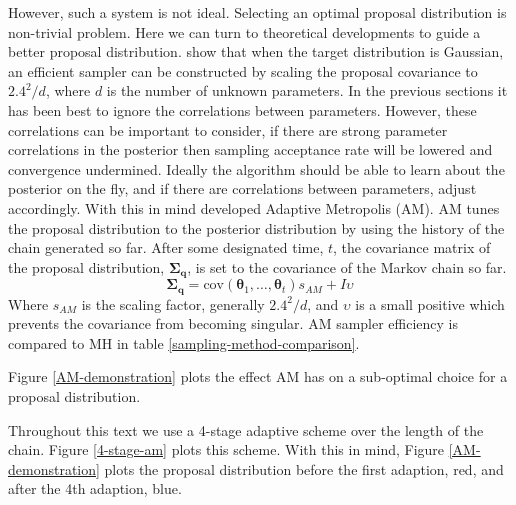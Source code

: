 However, such a system is not ideal. Selecting an optimal proposal distribution is non-trivial problem. Here we can turn to theoretical developments to guide a better proposal distribution. \citet{Gelman1996} show that when the target distribution is Gaussian, an efficient sampler can be constructed by scaling the proposal covariance to $2.4^2/d$, where $d$ is the number of unknown parameters. In the previous sections it has been best to ignore the correlations between parameters. However, these correlations can be important to consider, if there are strong parameter correlations in the posterior then sampling acceptance rate will be lowered and convergence undermined. Ideally the algorithm should be able to learn about the posterior on the fly, and if there are correlations between parameters, adjust accordingly. With this in mind \citet{haario2001} developed Adaptive Metropolis (AM). AM tunes the proposal distribution to the posterior distribution by using the history of the chain generated so far. After some designated time, $t$, the covariance matrix of the proposal distribution, $\bm{\Sigma_q}$, is set to the covariance of the Markov chain so far. 
\begin{equation}
\bm{\Sigma_q} = \text{cov}(\bm{\theta}_1,\dots,\bm{\theta}_t)s_{AM} + I\upsilon
\end{equation}
Where $s_{AM}$ is the scaling factor, generally $2.4^2/d$, and $\upsilon$ is a small positive which prevents the covariance from becoming singular. AM sampler efficiency is compared to MH in table \ref{sampling-method-comparison}.\par

Figure \ref{AM-demonstration} plots the effect AM has on a sub-optimal choice for a proposal distribution.\par

Throughout this text we use a 4-stage adaptive scheme over the length of the chain. Figure \ref{4-stage-am} plots this scheme. With this in mind, Figure \ref{AM-demonstration} plots the proposal distribution before the first adaption, red, and after the 4th adaption, blue. \\
\linebreak
\linebreak
\linebreak

